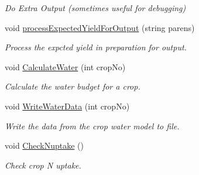 \begin{DoxyCompactItemize}
\begin{DoxyCompactList}\small\item\em Do Extra Output (sometimes useful for debugging) \end{DoxyCompactList}\item 
void \mbox{\hyperlink{class_crop_sequence_class_aff5bfa87d2cc1dea5dea8f29a4df32f0}{process\+Expected\+Yield\+For\+Output}} (string parens)
\begin{DoxyCompactList}\small\item\em Process the expcted yield in preparation for output. \end{DoxyCompactList}\item 
void \mbox{\hyperlink{class_crop_sequence_class_a6da5aec6d8259ce418a2948763ae20dd}{Calculate\+Water}} (int crop\+No)
\begin{DoxyCompactList}\small\item\em Calculate the water budget for a crop. \end{DoxyCompactList}\item 
void \mbox{\hyperlink{class_crop_sequence_class_a51e6061d67d1d2a167fb2c3ae9ea843c}{Write\+Water\+Data}} (int crop\+No)
\begin{DoxyCompactList}\small\item\em Write the data from the crop water model to file. \end{DoxyCompactList}\item 
void \mbox{\hyperlink{class_crop_sequence_class_a2299f9fcaead0dbd1e23d94b45c7196a}{Check\+Nuptake}} ()
\begin{DoxyCompactList}\small\item\em Check crop N uptake. \end{DoxyCompactList}\end{DoxyCompactItemize}
